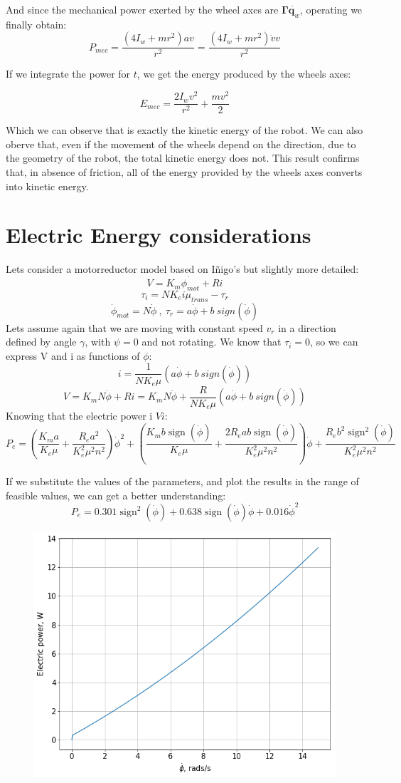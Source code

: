 \documentclass[12pt]{article}
\renewcommand{\vec}[1]{\bm{#1}}
\def\Torque{\vec \Gamma}
\def\q{\vec q}
\begin{document}
And since the mechanical power exerted by the wheel axes are $\Torque  \dot{\q_w}$, operating we finally obtain:
$$ P_{mec} =\frac{\left(4 I_{w} + m r^{2}\right) a v}{r^{2}} =\frac{\left(4 I_{w} + m r^{2}\right) \dot{v} v}{r^{2}}$$

If we integrate the power for $t$, we get the energy produced by the wheels axes:

$$E_{mec} = \frac{2 I_{w} v^{2}}{r^{2}} + \frac{m v^{2}}{2}$$

Which we can observe that is exactly the kinetic energy of the robot. We can also oberve that, even if the movement of the wheels depend on the direction, due to the geometry of the robot, the total kinetic energy does not. This result confirms that, in absence of friction, all of the energy provided by the wheels axes converts into kinetic energy.


\section*{Electric Energy considerations}

Lets consider a motorreductor model based on Iñigo's but slightly more detailed:
$$ V = K_m \dot{\phi_{mot}} + Ri $$
$$ \tau_i = N K_ei \mu_{trans} - \tau_r $$
$$ \dot{\phi}_{mot} = N \dot{\phi}\ , \ \tau_r = a \dot{\phi} + b\ sign(\dot{\phi}) $$
Lets assume again that we are moving with constant speed $v_r$ in a direction defined by angle $\gamma$, with $\psi = 0$ and not rotating.
We know that $\tau_i = 0$, so we can express V and i as functions of $\phi$:
$$ i = \frac{1}{N K_e \mu}(a \dot{\phi} + b\ sign(\dot{\phi}) )$$
$$ V =  K_m N \dot{\phi} + Ri = K_m N \dot{\phi} +\frac{R}{N K_e \mu}(a \dot{\phi} + b\ sign(\dot{\phi}) )$$
Knowing that the electric power i $V i$:
$$ P_e = \left(\frac{K_{m} a}{K_{e} \mu} + \frac{R_{e} a^{2}}{K_{e}^{2} \mu^{2} n^{2}}\right) \dot{\phi}^{2} + \left(\frac{K_{m} b \operatorname{sign}\left(\dot{\phi}\right)}{K_{e} \mu} + \frac{2 R_{e} a b \operatorname{sign}\left(\dot{\phi}\right)}{K_{e}^{2} \mu^{2} n^{2}}\right) \dot{\phi} + \frac{R_{e} b^{2} \operatorname{sign}^{2}\left(\dot{\phi}\right)}{K_{e}^{2} \mu^{2} n^{2}}$$

If we substitute the values of the parameters, and plot the results in the range of feasible values, we can get a better understanding:
$$ P_e = 0.301 \operatorname{sign}^{2}\left(\dot{\phi}\right) + 0.638 \operatorname{sign}\left(\dot{\phi}\right) \dot{\phi} + 0.016 \dot{\phi}^{2}$$
\begin{figure}[h]
	\centering
	\includegraphics[width=.5\linewidth]{pe_phidot}
	\label{fig:pe_phidot}
\end{figure}
\end{document}
